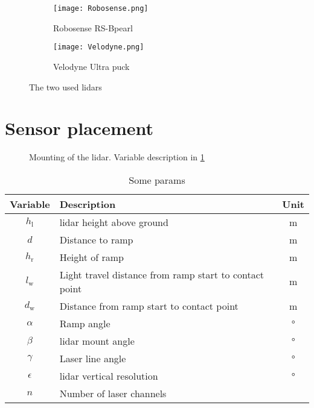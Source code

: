 \begin{figure}[htb]
	\centering
	\begin{subfigure}{0.3\textwidth}
		\centering
		\texttt{[image: Robosense.png]}
		\caption{Robosense RS-Bpearl \cite{RoboSense2020}}
		\label{fig:lidar_robosense}
	\end{subfigure}
	\begin{subfigure}{0.3\textwidth}
		\centering
		\texttt{[image: Velodyne.png]}
		\caption{Velodyne Ultra puck \cite{Velodyne2018}}
		\label{fig:lidar_velodyne}
	\end{subfigure}
	\caption{The two used \gls{lidar}s}
	\label{fig:lidars_used}
\end{figure}



\section{Sensor placement}
\begin{figure}[htpb]
	\centering
	
	\caption{Mounting of the \acrshort{lidar}. Variable description in \cref{tab:lidar_mount}}
	\label{fig:tikz_lidar_mount}
\end{figure}
\begin{table}[htbp]
	\centering
	\caption{Some params}
	\label{tab:lidar_mount}
	\begin{tabular}[t]{clc}
		\toprule
		\textbf{Variable} & \textbf{Description}                                   & \textbf{Unit} \\
		\midrule
		$h_\mathrm{l} $   & \gls{lidar} height above ground                        & \si{\metre}   \\
		$d$               & Distance to ramp                                       & \si{\metre}   \\
		$h_\mathrm{r}$    & Height of ramp                                         & \si{\metre}   \\
		$l_\mathrm{w}$    & Light travel distance from ramp start to contact point & \si{\metre}   \\
		$d_\mathrm{w}$    & Distance from ramp start to contact point              & \si{\metre}   \\
		$\alpha$          & Ramp angle                                             & \si{\degree}  \\
		$\beta$           & \gls{lidar} mount angle                                & \si{\degree}  \\
		$\gamma$          & Laser line angle                                       & \si{\degree}  \\
		$\epsilon$        & \gls{lidar} vertical resolution                        & \si{\degree}  \\
		$n$               & Number of laser channels                               &               \\
		\bottomrule
	\end{tabular}
\end{table}
